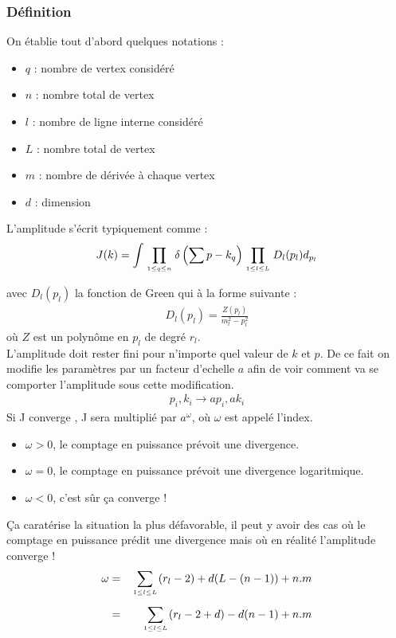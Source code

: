 \documentclass[a4paper,11pt]{article}
\theoremstyle{plain}
\theoremstyle{definition}
\theoremstyle{remark}
\numberwithin{equation}{section}
\numberwithin{equation}{subsection}
\numberwithin{figure}{section}
\begin{document}
\subsubsection{Définition}

\noindent
On établie tout d'abord quelques notations :
\begin{itemize}
\renewcommand{\labelitemi}{$\cdot$}
 \item $q$ : nombre de vertex considéré
 \item $n$ : nombre total de vertex
 \item $l$ : nombre de ligne interne considéré
 \item $L$ : nombre total de vertex
 \item $m$ : nombre de dérivée à chaque vertex
 \item $d$ : dimension
\end{itemize}
L'amplitude s'écrit typiquement comme :
\begin{eqnarray}
 J(k)= \int \prod_{ {1\le q\le n\atop} } \delta \left( \sum p - k_{q} \right) \prod_{1\le l\le L\atop} D_{l}(p_{l}) d_{p_{l}}
\end{eqnarray}
avec $D_{l}(p_{l})$ la fonction de Green qui à la forme suivante :
\begin{eqnarray}
 D_{l}(p_{l}) = \frac{Z(p_{l})}{ m_{l}^{2}-p_{l}^{2}  }
\end{eqnarray}
où $Z$ est un polynôme en $p_{l}$ de degré $r_{l}$.\\
L'amplitude doit rester fini pour n'importe quel valeur de $k$ et $p$. De ce fait on modifie les paramètres par un facteur d'echelle $a$ 
afin de voir comment va se comporter l'amplitude sous cette modification.
\begin{eqnarray}
 p_i , k_i \rightarrow a p_i , a k_i
\end{eqnarray}
Si J converge , J sera multiplié par $a^{\omega}$, où $\omega$ est appelé l'index.
\begin{itemize}
\renewcommand{\labelitemi}{$\cdot$}
 \item $\omega > 0$, le comptage en puissance prévoit une divergence.
 \item $\omega = 0$, le comptage en puissance prévoit une divergence logaritmique.
 \item $\omega < 0$, c'est sûr ça converge !
\end{itemize}
Ça caratérise la situation la plus défavorable, il peut y avoir des cas où le comptage en puissance prédit une divergence mais 
où en réalité l'amplitude converge !\\
\begin{eqnarray}
 \omega &=& \sum_{{1\le l\le L\atop}} (r_{l}-2) + d(L-(n-1)) + n.m\\
 &=& \sum_{{1\le l\le L\atop}} (r_{l}-2+d) - d(n-1) + n.m
\end{eqnarray}
\end{document}
